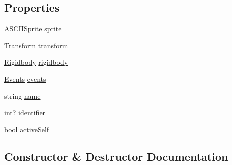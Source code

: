 \subsection*{Properties}
\begin{DoxyCompactItemize}
\item 
\mbox{\hyperlink{class_retro_engine_1_1_a_s_c_i_i_sprite}{A\+S\+C\+I\+I\+Sprite}} \mbox{\hyperlink{class_retro_engine_1_1_game_object_ac8f322b9fa5abb6664116b0c4cacf277}{sprite}}
\item 
\mbox{\hyperlink{class_retro_engine_1_1_transform}{Transform}} \mbox{\hyperlink{class_retro_engine_1_1_game_object_a74571987066a58b56e5f17f57da239e7}{transform}}
\item 
\mbox{\hyperlink{class_retro_engine_1_1_rigidbody}{Rigidbody}} \mbox{\hyperlink{class_retro_engine_1_1_game_object_aa53e6ae6f7a9a721237416ad2e03cbce}{rigidbody}}
\item 
\mbox{\hyperlink{class_retro_engine_1_1_game_object_1_1_events}{Events}} \mbox{\hyperlink{class_retro_engine_1_1_game_object_a5e7cf27b2493800ab14f82b703b5b9cc}{events}}
\item 
string \mbox{\hyperlink{class_retro_engine_1_1_game_object_aca939760b5e1dca14f075609013646e7}{name}}
\item 
int? \mbox{\hyperlink{class_retro_engine_1_1_game_object_a7335960584db9a54c40bed87bcc220e2}{identifier}}
\item 
bool \mbox{\hyperlink{class_retro_engine_1_1_game_object_a9deb77eaf2817e7c984bf80868765bc5}{active\+Self}}
\end{DoxyCompactItemize}


\subsection{Constructor \& Destructor Documentation}
\mbox{\label{class_retro_engine_1_1_game_object_addeff57df5f8e9edd369565a67e45723}} 
